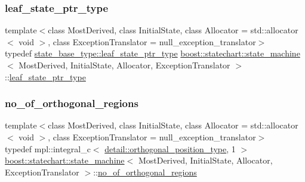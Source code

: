 \subsubsection{\texorpdfstring{leaf\+\_\+state\+\_\+ptr\+\_\+type}{leaf\_state\_ptr\_type}}
{\footnotesize\ttfamily template$<$class Most\+Derived, class Initial\+State, class Allocator = std\+::allocator$<$ void $>$, class Exception\+Translator = null\+\_\+exception\+\_\+translator$>$ \\
typedef \mbox{\hyperlink{classboost_1_1statechart_1_1detail_1_1state__base_a80b7d62ba0bb8e4fbef3e2e76e2a6021}{state\+\_\+base\+\_\+type\+::leaf\+\_\+state\+\_\+ptr\+\_\+type}} \mbox{\hyperlink{classboost_1_1statechart_1_1state__machine}{boost\+::statechart\+::state\+\_\+machine}}$<$ Most\+Derived, Initial\+State, Allocator, Exception\+Translator $>$\+::\mbox{\hyperlink{classboost_1_1statechart_1_1state__machine_a70f60d22dbc67497b1388e72e2bf6824}{leaf\+\_\+state\+\_\+ptr\+\_\+type}}}

\mbox{\label{classboost_1_1statechart_1_1state__machine_ae7f178d74dedd129cd88adffc0f63092}} 
\subsubsection{\texorpdfstring{no\+\_\+of\+\_\+orthogonal\+\_\+regions}{no\_of\_orthogonal\_regions}}
{\footnotesize\ttfamily template$<$class Most\+Derived, class Initial\+State, class Allocator = std\+::allocator$<$ void $>$, class Exception\+Translator = null\+\_\+exception\+\_\+translator$>$ \\
typedef mpl\+::integral\+\_\+c$<$ \mbox{\hyperlink{namespaceboost_1_1statechart_1_1detail_a3bedea0b807a16fa222733417183d2c9}{detail\+::orthogonal\+\_\+position\+\_\+type}}, 1 $>$ \mbox{\hyperlink{classboost_1_1statechart_1_1state__machine}{boost\+::statechart\+::state\+\_\+machine}}$<$ Most\+Derived, Initial\+State, Allocator, Exception\+Translator $>$\+::\mbox{\hyperlink{classboost_1_1statechart_1_1state__machine_ae7f178d74dedd129cd88adffc0f63092}{no\+\_\+of\+\_\+orthogonal\+\_\+regions}}}

\mbox{\label{classboost_1_1statechart_1_1state__machine_a5d90f1176309ec8307979aa79dd6f4a3}} 
